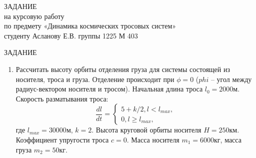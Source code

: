 \begin{center}
ЗАДАНИЕ\\
на курсовую работу\\
по предмету «Динамика космических тросовых систем»\\
студенту Асланову Е.В. группы 1225 М 403\\
\vspace{32pt}

ЗАДАНИЕ

\begin{enumerate}
	\item Рассчитать высоту орбиты отделения груза для системы состоящей из носителя, троса и груза. Отделение происходит при $\phi=0$ ($phi$ – угол между радиус-вектором носителя и тросом). Начальная длина троса $l_0=2000$м. Скорость разматывания троса:
	\begin{equation*}
		\frac{dl}{dt}=
		\begin{cases}
			5 + k/2, l < l_{max},\\
			0, l \geq l_{max},
		\end{cases}
	\end{equation*}
	где $l_{max} = 30000$м, $k=2$. Высота круговой орбиты носителя $H=250$км. Коэффициент упругости троса $c=0$. Масса носителя $m_1=6000$кг, масса груза $m_2=50$кг.
\end{enumerate}
\end{center}
